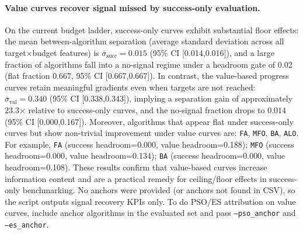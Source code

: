 \paragraph{Value curves recover signal missed by success-only evaluation.}
On the current budget ladder, success-only curves exhibit substantial floor effects: the mean between-algorithm
separation (average standard deviation across all target$\times$budget features) is
$\bar\sigma_\mathrm{succ}=0.015$ (95\% CI [0.014,0.016]),
and a large fraction of algorithms fall into a no-signal regime under a headroom gate of 0.02
(flat fraction $0.667$, 95\% CI [0.667,0.667]).
In contrast, the value-based progress curves retain meaningful gradients even when targets are not reached:
$\bar\sigma_\mathrm{val}=0.340$ (95\% CI [0.338,0.343]),
implying a separation gain of approximately 23.3$\times$ relative to success-only curves,
and the no-signal fraction drops to $0.014$ (95\% CI [0.000,0.167]).
Moreover, algorithms that appear flat under success-only curves but show non-trivial improvement under value curves are:
\texttt{FA}, \texttt{MFO}, \texttt{BA}, \texttt{ALO}.
For example, \texttt{FA} (success headroom=0.000, value headroom=0.188); \texttt{MFO} (success headroom=0.000, value headroom=0.134); \texttt{BA} (success headroom=0.000, value headroom=0.108).
These results confirm that value-based curves increase information content and are a practical remedy for ceiling/floor
effects in success-only benchmarking. No anchors were provided (or anchors not found in CSV), so the script outputs signal recovery KPIs only. To do PSO/ES attribution on value curves, include anchor algorithms in the evaluated set and pass \texttt{--pso\_anchor} and \texttt{--es\_anchor}.
